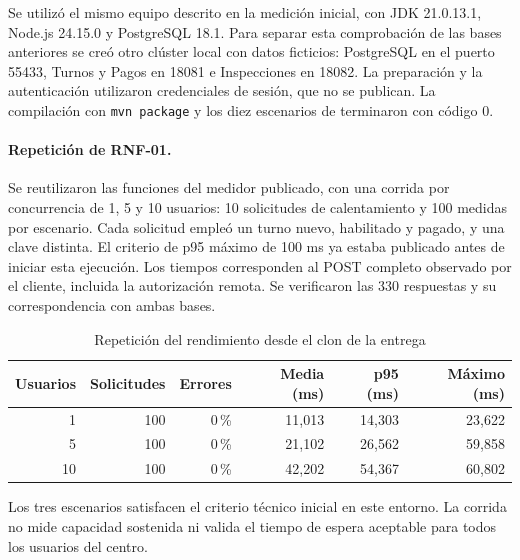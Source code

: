 \documentclass[11pt,a4paper]{article}
\begin{document}
	Se utilizó el mismo equipo descrito en la medición inicial, con JDK 21.0.13.1, Node.js 24.15.0 y PostgreSQL 18.1. Para separar esta comprobación de las bases anteriores se creó otro clúster local con datos ficticios: PostgreSQL en el puerto 55433, Turnos y Pagos en 18081 e Inspecciones en 18082. La preparación y la autenticación utilizaron credenciales de sesión, que no se publican. La compilación con \texttt{mvn package} y los diez escenarios de  terminaron con código 0.
	
	\paragraph{Repetición de RNF-01.}
	Se reutilizaron las funciones del medidor publicado, con una corrida por concurrencia de 1, 5 y 10 usuarios: 10 solicitudes de calentamiento y 100 medidas por escenario. Cada solicitud empleó un turno nuevo, habilitado y pagado, y una clave distinta. El criterio de p95 máximo de 100 ms ya estaba publicado antes de iniciar esta ejecución. Los tiempos corresponden al POST completo observado por el cliente, incluida la autorización remota. Se verificaron las 330 respuestas y su correspondencia con ambas bases.
	
	\begin{table}[htbp]
		\centering
		\caption{Repetición del rendimiento desde el clon de la entrega}\label{tab:p95-clon-calidad}
		\begin{tabular}{rrrrrr}
			\toprule
			\textbf{Usuarios} & \textbf{Solicitudes} & \textbf{Errores} & \textbf{Media (ms)} & \textbf{p95 (ms)} & \textbf{Máximo (ms)} \\
			\midrule
			1 & 100 & 0\,\% & 11,013 & 14,303 & 23,622 \\
			5 & 100 & 0\,\% & 21,102 & 26,562 & 59,858 \\
			10 & 100 & 0\,\% & 42,202 & 54,367 & 60,802 \\
			\bottomrule
		\end{tabular}
	\end{table}
	
	Los tres escenarios satisfacen el criterio técnico inicial en este entorno. La corrida no mide capacidad sostenida ni valida el tiempo de espera aceptable para todos los usuarios del centro.
	
\end{document}
